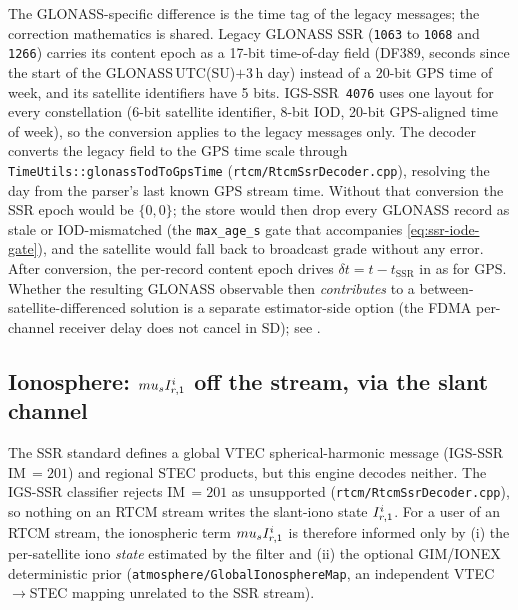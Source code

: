 \documentclass[main.tex]{subfiles}
\begin{document}
The GLONASS-specific difference is the time tag of the legacy messages;
the correction mathematics is shared. Legacy GLONASS SSR (\texttt{1063} to
\texttt{1068} and \texttt{1266}) carries its content epoch as a 17-bit
time-of-day field (DF389, seconds since the start of the
GLONASS\,UTC(SU)$+3$\,h day) instead of a 20-bit GPS time of week, and its
satellite identifiers have 5 bits. IGS-SSR~\texttt{4076} uses one layout for
every constellation (6-bit satellite identifier, 8-bit IOD, 20-bit
GPS-aligned time of week), so the conversion applies to the legacy messages
only. The decoder converts the legacy field to the GPS time scale through
\texttt{TimeUtils::glonassTodToGpsTime}
(\texttt{rtcm/RtcmSsrDecoder.cpp}), resolving the day from the parser's
last known GPS stream time. Without that conversion the SSR epoch would
be $\{0,0\}$; the store would then drop every GLONASS record as stale or
IOD-mismatched (the \texttt{max\_age\_s} gate that accompanies
\eqref{eq:ssr-iode-gate}), and the satellite would fall back to broadcast
grade without any error. After conversion, the per-record content
epoch drives $\delta t = t - t_{\mathrm{SSR}}$ in
 as for GPS. Whether the
resulting GLONASS observable then \emph{contributes} to a
between-satellite-differenced solution is a separate estimator-side
option (the FDMA per-channel receiver delay does not cancel in SD); see
.

\subsection{Ionosphere: $mu_s I^i_{r,1}$ off the stream, via the slant channel}

The SSR standard defines a global VTEC spherical-harmonic message
(IGS-SSR IM\,$=201$) and regional STEC products, but this engine decodes
neither. The IGS-SSR classifier rejects IM\,$=201$ as unsupported
(\texttt{rtcm/RtcmSsrDecoder.cpp}), so nothing on an RTCM stream writes the
slant-iono state $I^i_{r,1}$. For a user of an RTCM stream, the
ionospheric term $mu_s I^i_{r,1}$ is therefore informed only by
(i) the per-satellite iono \emph{state} estimated by the filter and
(ii) the optional GIM/IONEX deterministic prior
(\texttt{atmosphere/GlobalIonosphereMap}, an independent VTEC$\to$STEC
mapping unrelated to the SSR stream).
\end{document}
